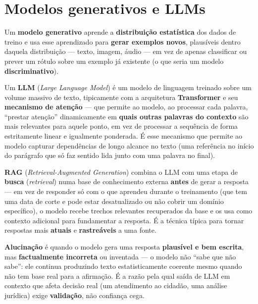 \section{Modelos generativos e LLMs}

\begin{conceito}
Um \textbf{modelo generativo} aprende a \textbf{distribuição estatística}
dos dados de treino e usa esse aprendizado para \textbf{gerar exemplos
novos}, plausíveis dentro daquela distribuição --- texto, imagem, áudio ---
em vez de apenas classificar ou prever um rótulo sobre um exemplo já
existente (o que seria um modelo \textbf{discriminativo}).
\end{conceito}

\begin{conceito}
Um \textbf{LLM} (\textit{Large Language Model}) é um modelo de linguagem
treinado sobre um volume massivo de texto, tipicamente com a arquitetura
\textbf{Transformer} e seu \textbf{mecanismo de atenção} --- que permite ao
modelo, ao processar cada palavra, “prestar atenção” dinamicamente em
\textbf{quais outras palavras do contexto} são mais relevantes para aquele
ponto, em vez de processar a sequência de forma estritamente linear e
igualmente ponderada. É esse mecanismo que permite ao modelo capturar
dependências de longo alcance no texto (uma referência no início do
parágrafo que só faz sentido lida junto com uma palavra no final).
\end{conceito}

\begin{conceito}
\textbf{RAG} (\textit{Retrieval-Augmented Generation}) combina o LLM com
uma etapa de \textbf{busca} (\textit{retrieval}) numa base de conhecimento
externa \textbf{antes} de gerar a resposta --- em vez de responder só com
o que aprendeu durante o treinamento (que tem uma data de corte e pode
estar desatualizado ou não cobrir um domínio específico), o modelo recebe
trechos relevantes recuperados da base e os usa como contexto adicional
para fundamentar a resposta. É a técnica típica para tornar respostas mais
\textbf{atuais} e \textbf{rastreáveis} a uma fonte.
\end{conceito}

\begin{conceito}
\textbf{Alucinação} é quando o modelo gera uma resposta \textbf{plausível
e bem escrita}, mas \textbf{factualmente incorreta} ou inventada --- o
modelo não “sabe que não sabe”: ele continua produzindo texto
estatisticamente coerente mesmo quando não tem base real para a afirmação.
É a razão pela qual saída de LLM em contexto que afeta decisão real (um
atendimento ao cidadão, uma análise jurídica) exige \textbf{validação},
não confiança cega.
\end{conceito}


